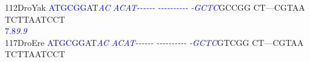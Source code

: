 \documentclass[11pt,twoside,reqno,a4paper]{article}
\begin{document}
{112\hspace*{1\charwidth}DroYak	\textcolor{blue}{A}\textcolor{blue}{T}\textcolor{blue}{G}\textcolor{blue}{C}\textcolor{blue}{G}\textcolor{blue}{G}AT\textit{\textcolor{blue}{A}}\textit{\textcolor{blue}{C}}	\textit{\textcolor{blue}{A}}\textit{\textcolor{blue}{C}}\textit{\textcolor{blue}{A}}\textit{\textcolor{blue}{T}}\textit{\textcolor{blue}{-}}\textit{\textcolor{blue}{-}}\textit{\textcolor{blue}{-}}\textit{\textcolor{blue}{-}}\textit{\textcolor{blue}{-}}\textit{\textcolor{blue}{-}}	\textit{\textcolor{blue}{-}}\textit{\textcolor{blue}{-}}\textit{\textcolor{blue}{-}}\textit{\textcolor{blue}{-}}\textit{\textcolor{blue}{-}}\textit{\textcolor{blue}{-}}\textit{\textcolor{blue}{-}}\textit{\textcolor{blue}{-}}\textit{\textcolor{blue}{-}}\textit{\textcolor{blue}{-}}	\textit{\textcolor{blue}{-}}\textit{\textcolor{blue}{G}}\textit{\textcolor{blue}{C}}\textit{\textcolor{blue}{T}}\textit{\textcolor{blue}{C}}GCCGG	CT---CGTAA	TCTTAATCCT	\\
\hspace*{4\charwidth}\hspace*{7\charwidth}\hspace*{0\charwidth}\textcolor{blue}{7.8}\hspace*{5\charwidth}\textit{\textcolor{blue}{9.9}}\hspace*{1\charwidth}\hspace*{1\charwidth}\hspace*{1\charwidth}\hspace*{1\charwidth}\hspace*{1\charwidth}\hspace*{1\charwidth}\\
117\hspace*{1\charwidth}DroEre	\textcolor{blue}{A}\textcolor{blue}{T}\textcolor{blue}{G}\textcolor{blue}{C}\textcolor{blue}{G}\textcolor{blue}{G}AT\textit{\textcolor{blue}{A}}\textit{\textcolor{blue}{C}}	\textit{\textcolor{blue}{A}}\textit{\textcolor{blue}{C}}\textit{\textcolor{blue}{A}}\textit{\textcolor{blue}{T}}\textit{\textcolor{blue}{-}}\textit{\textcolor{blue}{-}}\textit{\textcolor{blue}{-}}\textit{\textcolor{blue}{-}}\textit{\textcolor{blue}{-}}\textit{\textcolor{blue}{-}}	\textit{\textcolor{blue}{-}}\textit{\textcolor{blue}{-}}\textit{\textcolor{blue}{-}}\textit{\textcolor{blue}{-}}\textit{\textcolor{blue}{-}}\textit{\textcolor{blue}{-}}\textit{\textcolor{blue}{-}}\textit{\textcolor{blue}{-}}\textit{\textcolor{blue}{-}}\textit{\textcolor{blue}{-}}	\textit{\textcolor{blue}{-}}\textit{\textcolor{blue}{G}}\textit{\textcolor{blue}{C}}\textit{\textcolor{blue}{T}}\textit{\textcolor{blue}{C}}GTCGG	CT---CGTAA	TCTTAATCCT	\\
}
\end{document}
